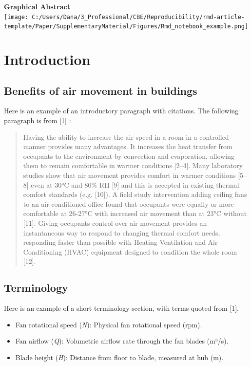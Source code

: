 \documentclass[]{elsarticle} %
\providecommand{\tightlist}{%
  \setlength{\itemsep}{0pt}\setlength{\parskip}{0pt}}
\begin{document}
\textbf{Graphical Abstract}\\
\texttt{[image: C:/Users/Dana/3\_Professional/CBE/Reproducibility/rmd-article-template/Paper/SupplementaryMaterial/Figures/Rmd\_notebook\_example.png]}

\pagebreak

\section{Introduction}\label{introduction}

\subsection{Benefits of air movement in
buildings}\label{benefits-of-air-movement-in-buildings}

Here is an example of an introductory paragraph with citations. The
following paragraph is from {[}1{]} :

\begin{quote}
Having the ability to increase the air speed in a room in a controlled
manner provides many advantages. It increases the heat transfer from
occupants to the environment by convection and evaporation, allowing
them to remain comfortable in warmer conditions {[}2--4{]}. Many
laboratory studies show that air movement provides comfort in warmer
conditions {[}5--8{]} even at 30°C and 80\% RH {[}9{]} and this is
accepted in existing thermal comfort standards (e.g. {[}10{]}). A field
study intervention adding ceiling fans to an air-conditioned office
found that occupants were equally or more comfortable at 26-27°C with
increased air movement than at 23°C without {[}11{]}. Giving occupants
control over air movement provides an instantaneous way to respond to
changing thermal comfort needs, responding faster than possible with
Heating Ventilation and Air Conditioning (HVAC) equipment designed to
condition the whole room {[}12{]}.
\end{quote}

\subsection{Terminology}\label{terminology}

Here is an example of a short terminology section, with terms quoted
from {[}1{]}.

\begin{itemize}
\tightlist
\item
  Fan rotational speed (\emph{N}): Physical fan rotational speed (rpm).
\item
  Fan airflow (\emph{Q}): Volumetric airflow rate through the fan blades
  (m³/s).
\item
  Blade height (\emph{H}): Distance from floor to blade, measured at hub
  (m).
\end{itemize}
\end{document}
